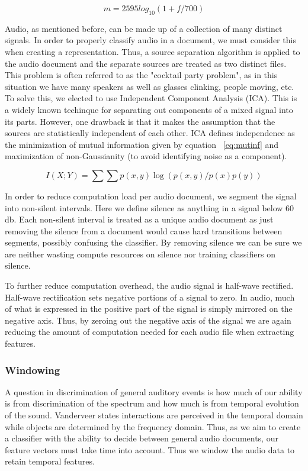 \begin{equation} \label{eq:meleqn}
    \textit{m} = 2595log_10(1+\textit{f}/700)
\end{equation}

Audio, as mentioned before, can be made up of a collection of many distinct signals. In order to properly classify audio in a document, we must consider this when creating a representation. Thus, a source separation algorithm is applied to the audio document and the separate sources are treated as two distinct files. This problem is often referred to as the "cocktail party problem", as in this situation we have many speakers as well as glasses clinking, people moving, etc. To solve this, we elected to use Independent Component Analysis (ICA). This is a widely known techinque for separating out components of a mixed signal into its parts. However, one drawback is that it makes the assumption that the sources are statistically independent of each other. ICA defines independence as the minimization of mutual information given by equation ~\cref{eq:mutinf} and maximization of non-Gaussianity (to avoid identifying noise as a component).

\begin{equation} \label{eq:mutinf}
    I(X;Y) = \sum\sum p(x,y)\log(p(x,y)/p(x)p(y))
\end{equation}

In order to reduce computation load per audio document, we segment the signal into non-silent intervals. Here we define silence as anything in a signal below 60 db. Each non-silent interval is treated as a unique audio document as just removing the silence from a document would cause hard transitions between segments, possibly confusing the classifier. By removing silence we can be sure we are neither wasting compute resources on silence nor training classifiers on silence.

To further reduce computation overhead, the audio signal is half-wave rectified. Half-wave rectification sets negative portions of a signal to zero. In audio, much of what is expressed in the positive part of the signal is simply mirrored on the negative axis. Thus, by zeroing out the negative axis of the signal we are again reducing the amount of computation needed for each audio file when extracting features.

\subsubsection{Windowing}
A question in discrimination of general auditory events is how much of our ability is from discrimination of the spectrum and how much is from temporal evolution of the sound. Vanderveer states interactions are perceived in the temporal domain while objects are determined by the frequency domain. Thus, as we aim to create a classifier with the ability to decide between general audio documents, our feature vectors must take time into account. Thus we window the audio data to retain temporal features.



